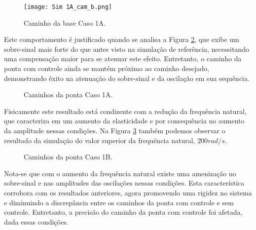 \begin{figure}[H]
    \centering
    \caption{Caminho da base Caso 1A.}
    \texttt{[image: Sim 1A\_cam\_b.png]}

    \label{fig:1A_cam_b}
\end{figure}

Este comportamento é justificado quando se analisa a Figura \ref{fig:1A_cam_p_s}, que exibe um sobre-sinal mais forte do que antes visto na simulação de referência, necessitando uma compensação maior para se atenuar este efeito. Entretanto, o caminho da ponta com controle ainda se mantém próximo ao caminho desejado, demonstrando êxito na atenuação do sobre-sinal e da oscilação em sua sequência.

\begin{figure}[H]
    \centering
    \hfill
    \caption{Caminhos da ponta Caso 1A.}
    \label{fig:1A_cam_p_s}
\end{figure}

Fisicamente este resultado está condizente com a redução da frequência natural, que caracteriza em um aumento da elasticidade e por consequência no aumento da amplitude nessas condições. Na Figura \ref{fig:1B_cam_p_s} também podemos observar o resultado da simulação do valor superior da frequência natural, \(200 rad/s\). 

\begin{figure}[H]
    \centering
    \hfill
    \caption{Caminhos da ponta Caso 1B.}
    \label{fig:1B_cam_p_s}
\end{figure}

Nota-se que com o aumento da frequência natural existe uma amenização no sobre-sinal e nas amplitudes das oscilações nessas condições. Esta característica corrobora com os resultados anteriores, agora promovendo uma rigidez no sistema e diminuindo a discrepância entre os caminhos da ponta com controle e sem controle. Entretanto, a precisão do caminho da ponta com controle foi afetada, dada essas condições.

